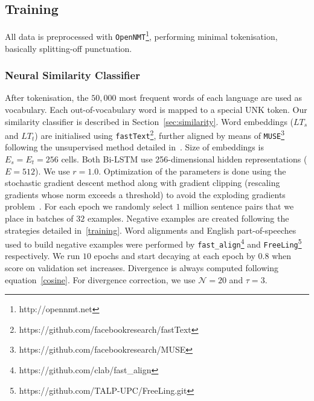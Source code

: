 \documentclass[11pt,a4paper]{article}
\begin{document}

\subsection{Training}

All data is preprocessed with \texttt{OpenNMT}\footnote{http://opennmt.net}, performing minimal tokenisation, basically splitting-off punctuation.

\subsubsection{Neural Similarity Classifier}
\label{divergence}

After tokenisation, the $50,000$ most frequent words of each language are used as vocabulary.
Each out-of-vocabulary word is mapped to a special UNK token.
Our similarity classifier is described in Section~\ref{sec:similarity}. 
Word embeddings ($LT_s$ and $LT_t$) are initialised using \texttt{fastText}\footnote{https://github.com/facebookresearch/fastText}, further aligned by means of \texttt{MUSE}\footnote{https://github.com/facebookresearch/MUSE} following the unsupervised method detailed in~\cite{lample2018word}. 
Size of embeddings is $E_s=E_t=256$ cells. 
Both Bi-LSTM use 256-dimensional hidden representations ($E=512$). 
We use $r=1.0$. 
Optimization of the parameters is done using the stochastic gradient descent method along with gradient clipping (rescaling gradients whose norm exceeds a threshold) to avoid the exploding gradients problem~\cite{Pascanu:2013:DTR:3042817.3043083}. 
For each epoch we randomly select $1$ million sentence pairs that we place in batches of $32$ examples.  
Negative examples are created following the strategies detailed in~\ref{training}.
Word alignments and English part-of-speeches used to build negative examples were performed by \texttt{fast\_align}\footnote{https://github.com/clab/fast\_align} and \texttt{FreeLing}\footnote{https://github.com/TALP-UPC/FreeLing.git} respectively.
We run $10$ epochs and start decaying at each epoch by $0.8$ when score on validation set increases. 
Divergence is always computed following equation~\ref{cosine}. 
For divergence correction, we use $\mathcal{N}=20$ and $\tau=3$.
\end{document}
